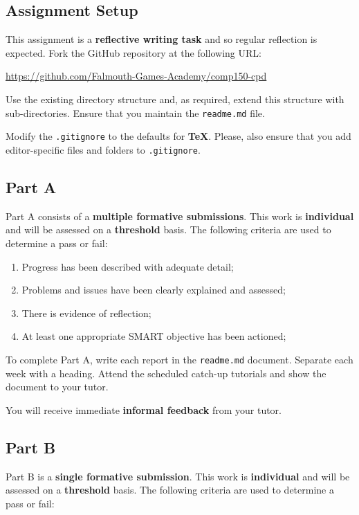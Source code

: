 \documentclass{../fal_assignment}
\begin{document}
\subsection*{Assignment Setup}

This assignment is a \textbf{reflective writing task} and so regular reflection is expected. Fork the GitHub repository at the following URL:

\indent \url{https://github.com/Falmouth-Games-Academy/comp150-cpd}

Use the existing directory structure and, as required, extend this structure with sub-directories. Ensure that you maintain the \texttt{readme.md} file. 

Modify the \texttt{.gitignore} to the defaults for \textbf{TeX}. Please, also ensure that you add editor-specific files and folders to \texttt{.gitignore}. 

\subsection*{Part A}

Part A consists of a \textbf{multiple formative submissions}. This work is \textbf{individual} and will be assessed on a \textbf{threshold} basis. The following criteria are used to determine a pass or fail:

\begin{enumerate}[label=(\alph*)]
	\item Progress has been described with adequate detail;
	\item Problems and issues have been clearly explained and assessed;
	\item There is evidence of reflection;
	\item At least one appropriate SMART objective has been actioned;
\end{enumerate}

To complete Part A, write each report in the \texttt{readme.md} document. Separate each week with a heading. Attend the scheduled catch-up tutorials and show the document to your tutor. 

You will receive immediate \textbf{informal feedback} from your tutor.

\subsection*{Part B}

Part B is a \textbf{single formative submission}. This work is \textbf{individual} and will be assessed on a \textbf{threshold} basis. The following criteria are used to determine a pass or fail:
\end{document}
